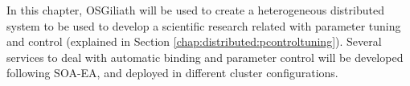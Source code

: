 




In this chapter, OSGiliath will be used %
 to create a heterogeneous distributed system to be used to develop a scientific research related with parameter tuning and control (explained in Section \ref{chap:distributed:pcontroltuning}). Several services to deal with automatic binding and parameter control will be developed following SOA-EA, and deployed in different cluster configurations.








